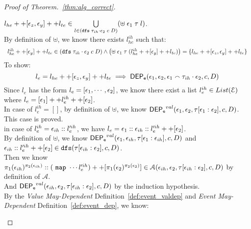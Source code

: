 \begin{proof}[Proof of Theorem.~\ref{thm:alg_correct}]
\begin{case}
\begin{subcase}
%
$l_{he} ++ [\mathtt{\epsilon}_z, \mathtt{\epsilon}_y] ++ l_{te}  \in  
\bigcup\limits_{l \in (\mathtt{dfs} \; {\mathtt{\tau}_{ih} \cdot \mathtt{\epsilon}_2} \; c \; D) } (\uplus \; \mathtt{\epsilon}_1 \; \mathtt{\tau} \; l)$.
\\
By definition of $\uplus$, we know there exists $l^{ih}_{he}$ such that:
\[
\begin{array}{l}
  l^{ih}_{he} ++ [\event_y] ++ l_{te} \in (\kw{dfs} \eapp {\trace_{ih} \cdot \event_2} \eapp c \eapp D )
  \land
  \left(\uplus \eapp \event_1 \eapp \trace \eapp ( l^{ih}_{he} ++ [\event_y] ++ l_{te}) \right) 
  = \{l_{he} ++ [\event_z, \event_y] ++ l_{te}\}
\end{array}
\]
To show:
\[  
  l_e = l_{he} ++ [\mathtt{\epsilon}_z, \mathtt{\epsilon}_y] ++ l_{te}
  \implies
\mathsf{DEP_{\mathtt{e}}}(\mathtt{\epsilon}_1, \mathtt{\epsilon}_2, \mathtt{\epsilon}_1 \smallfrown \mathtt{\tau}_{ih} \cdot \mathtt{\epsilon}_2, {c}, D) 
\]
Since $l_e$ has the form $l_e = [\mathtt{\epsilon}_1, \cdots, \mathtt{\epsilon}_2] $, 
we know there exist a list $l^{ih}_e \in List(\mathcal{E})$
where $l_e = [\mathtt{\epsilon}_1] ++ l^{ih}_e ++ [\mathtt{\epsilon}_2]$.
\\
In case of $l^{ih}_e = []$, by definition of $\uplus$, we know $\mathsf{DEP_{\mathtt{e}}}^{val}(\mathtt{\epsilon}_1, \mathtt{\epsilon}_{2}, \mathtt{\tau}[\mathtt{\epsilon}_1:\mathtt{\epsilon}_{2}], c, D)$.
This case is proved.
\\
in case of $l^{ih}_e =  \mathtt{\epsilon}_{ih}::l'^{ih}_e$, we have
 $l_e = \mathtt{\epsilon}_1::\mathtt{\epsilon}_{ih}::l'^{ih}_e ++ [\mathtt{\epsilon}_2]$.
\\
By definition of $\uplus$, we know $\mathsf{DEP_{\mathtt{e}}}^{val}(\mathtt{\epsilon}_1, \mathtt{\epsilon}_{ih}, \mathtt{\tau}[\mathtt{\epsilon}_1:\mathtt{\epsilon}_{ih}], c, D)$ and 
$\mathtt{\epsilon}_{ih}::l'^{ih}_e ++ [\mathtt{\epsilon}_2] \in \mathtt{dfs}(\mathtt{\tau}[\mathtt{\epsilon}_{ih}:\mathtt{\epsilon}_2], c, D)$.
\\
Then we know $\pi_1(\mathtt{\epsilon}_{ih})^{\pi_2(\mathtt{\epsilon}_{ih})}:: 
(~\mathtt{map}~ \cdots l'^{ih}_e) ++ [\pi_1(\mathtt{\epsilon}_{2})^{\pi_2(\mathtt{\epsilon}_{2})}] \in \mathcal{A}(\mathtt{\epsilon}_{ih}, \mathtt{\epsilon}_2, \mathtt{\tau}[\mathtt{\epsilon}_{ih}:\mathtt{\epsilon}_2], c, D)$ by definition of $\mathcal{A}$.
\\
And $\mathsf{DEP_{\mathtt{e}}}^{val}(\mathtt{\epsilon}_{ih}, \mathtt{\epsilon}_2, \mathtt{\tau}[\mathtt{\epsilon}_{ih}:\mathtt{\epsilon}_2], c, D)$ by the induction hypothesis.
\\
By the \emph{Value May-Dependent} Definition~\ref{def:event_valdep} and \emph{Event May-Dependent} Definition~\ref{def:event_dep}, we know:

\end{subcase}
\end{case}
\end{proof}
